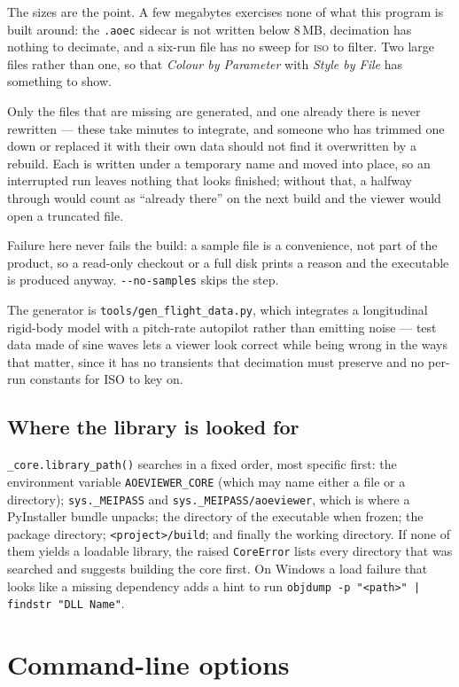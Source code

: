 \documentclass[11pt,a4paper,oneside]{report}
\newcommand{\code}[1]{\texttt{#1}}
\newcommand{\key}[1]{\textsf{\small\fbox{#1}}}
\newcommand{\tab}[1]{\textsc{#1}}
\begin{document}
The sizes are the point. A few megabytes exercises none of what this program is
built around: the \code{.aoec} sidecar is not written below 8\,MB, decimation
has nothing to decimate, and a six-run file has no sweep for \tab{iso} to
filter. Two large files rather than one, so that \emph{Colour by Parameter}
with \emph{Style by File} has something to show.

Only the files that are missing are generated, and one already there is never
rewritten --- these take minutes to integrate, and someone who has trimmed one
down or replaced it with their own data should not find it overwritten by a
rebuild. Each is written under a temporary name and moved into place, so an
interrupted run leaves nothing that looks finished; without that, a
\key{Ctrl+C} halfway through would count as ``already there'' on the next
build and the viewer would open a truncated file.

Failure here never fails the build: a sample file is a convenience, not part of
the product, so a read-only checkout or a full disk prints a reason and the
executable is produced anyway. \code{-{}-no-samples} skips the step.

The generator is \code{tools/gen\_flight\_data.py}, which integrates a
longitudinal rigid-body model with a pitch-rate autopilot rather than emitting
noise --- test data made of sine waves lets a viewer look correct while being
wrong in the ways that matter, since it has no transients that decimation must
preserve and no per-run constants for ISO to key on.

\subsection{Where the library is looked for}

\code{\_core.library\_path()} searches in a fixed order, most specific first:
the environment variable \code{AOEVIEWER\_CORE} (which may name either a file or
a directory); \code{sys.\_MEIPASS} and \code{sys.\_MEIPASS/aoeviewer}, which is
where a PyInstaller bundle unpacks; the directory of the executable when frozen;
the package directory; \code{<project>/build}; and finally the working
directory. If none of them yields a loadable library, the raised
\code{CoreError} lists every directory that was searched and suggests building
the core first. On Windows a load failure that looks like a missing dependency
adds a hint to run \code{objdump -p "<path>" | findstr "DLL Name"}.

\section{Command-line options}
\end{document}

